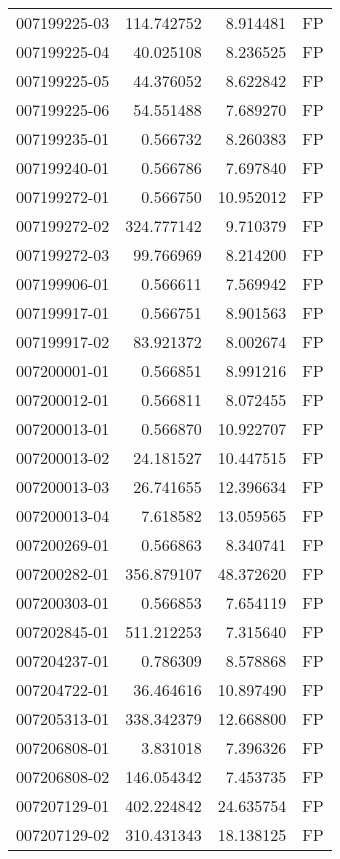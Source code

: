 \begin{tabular}{lrrl}
007199225-03 &  114.742752 &     8.914481 &   FP \\
007199225-04 &   40.025108 &     8.236525 &   FP \\
007199225-05 &   44.376052 &     8.622842 &   FP \\
007199225-06 &   54.551488 &     7.689270 &   FP \\
007199235-01 &    0.566732 &     8.260383 &   FP \\
007199240-01 &    0.566786 &     7.697840 &   FP \\
007199272-01 &    0.566750 &    10.952012 &   FP \\
007199272-02 &  324.777142 &     9.710379 &   FP \\
007199272-03 &   99.766969 &     8.214200 &   FP \\
007199906-01 &    0.566611 &     7.569942 &   FP \\
007199917-01 &    0.566751 &     8.901563 &   FP \\
007199917-02 &   83.921372 &     8.002674 &   FP \\
007200001-01 &    0.566851 &     8.991216 &   FP \\
007200012-01 &    0.566811 &     8.072455 &   FP \\
007200013-01 &    0.566870 &    10.922707 &   FP \\
007200013-02 &   24.181527 &    10.447515 &   FP \\
007200013-03 &   26.741655 &    12.396634 &   FP \\
007200013-04 &    7.618582 &    13.059565 &   FP \\
007200269-01 &    0.566863 &     8.340741 &   FP \\
007200282-01 &  356.879107 &    48.372620 &   FP \\
007200303-01 &    0.566853 &     7.654119 &   FP \\
007202845-01 &  511.212253 &     7.315640 &   FP \\
007204237-01 &    0.786309 &     8.578868 &   FP \\
007204722-01 &   36.464616 &    10.897490 &   FP \\
007205313-01 &  338.342379 &    12.668800 &   FP \\
007206808-01 &    3.831018 &     7.396326 &   FP \\
007206808-02 &  146.054342 &     7.453735 &   FP \\
007207129-01 &  402.224842 &    24.635754 &   FP \\
007207129-02 &  310.431343 &    18.138125 &   FP \\

\end{tabular}

